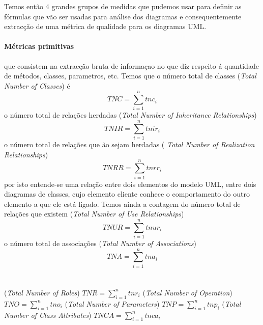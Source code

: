 Temos então 4 grandes grupos de medidas que pudemos usar para definir as fórmulas que vão ser usadas para análise dos diagramas e consequentemente extracção de uma métrica
de qualidade para os diagramas UML.
\paragraph{Métricas primitivas} que consistem na extracção bruta de informaçao no que diz respeito á quantidade de métodos, classes, parametros, etc.
Temos que o número total de classes (\textit{Total Number of Classes}) é $$TNC = \sum_{i=1}^{n} tnc_i $$
o número total de relações herdadas (\textit{Total Number of Inheritance Relationships})  $$TNIR = \sum_{i=1}^{n} tnir_i $$
o número total de relações que ão sejam herdadas (\textit{ Total Number of Realization Relationships})  $$TNRR = \sum_{i=1}^{n} tnrr_i $$ por isto entende-se
uma relação entre dois elementos do modelo UML, entre dois diagramas de classes, cujo elemento cliente conhece o comportamento do outro elemento a que ele está ligado.
Temos ainda a contagem do número total de relações que existem (\textit{Total Number of Use Relationships})  $$TNUR = \sum_{i=1}^{n} tnur_i $$
o número total de associações (\textit{Total Number of Associations})    $$TNA = \sum_{i=1}^{n} tna_i $$
\\\\
(\textit{Total Number of Roles})   $TNR = \sum_{i=1}^{n} tnr_i $
(\textit{Total Number of Operation})   $TNO = \sum_{i=1}^{n} tno_i $
(\textit{Total Number of Parameters})  $TNP = \sum_{i=1}^{n} tnp_i $
(\textit{Total Number of Class Attributes})  $TNCA = \sum_{i=1}^{n} tnca_i $

